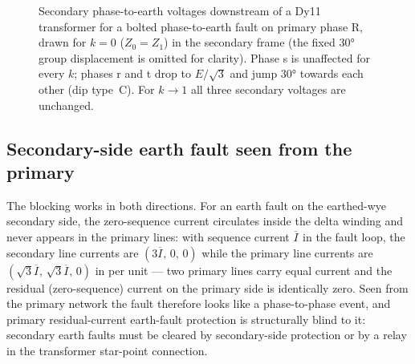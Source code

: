 \documentclass[a4paper,11pt]{article}
\newcommand{\ph}[1]{\mathrm{#1}}
\newcommand{\pE}[1]{\overline{E}_{\ph{#1}}}
\newcommand{\pU}[1]{\overline{U}_{\ph{#1}}}
\newcommand{\pI}[1]{\overline{I}_{#1}}
\begin{document}
\begin{figure}[htb]
\centering
{}
\caption{Secondary phase-to-earth voltages downstream of a Dy11 transformer
for a bolted phase-to-earth fault on primary phase R, drawn for $k=0$
($Z_{0}=Z_{1}$) in the secondary frame (the fixed \ang{30} group displacement
is omitted for clarity). Phase s is unaffected for every $k$; phases r and t
drop to $E/\sqrt{3}$ and jump \ang{30} towards each other (dip type~C). For
$k\to 1$ all three secondary voltages are unchanged.}
\label{fig:dy11}
\end{figure}

\subsection{Secondary-side earth fault seen from the primary}

The blocking works in both directions. For an earth fault on the
earthed-wye secondary side, the zero-sequence current circulates inside the
delta winding and never appears in the primary lines: with sequence current
$\pI{}$ in the fault loop, the secondary line currents are $(3\pI{},\,0,\,0)$
while the primary line currents are $(\sqrt{3}\pI{},\,\sqrt{3}\pI{},\,0)$ in
per unit --- two primary lines carry equal current and the residual
(zero-sequence) current on the primary side is identically zero. Seen from
the primary network the fault therefore looks like a phase-to-phase event,
and primary residual-current earth-fault protection is structurally blind to
it: secondary earth faults must be cleared by secondary-side protection or by
a relay in the transformer star-point connection.
\end{document}
